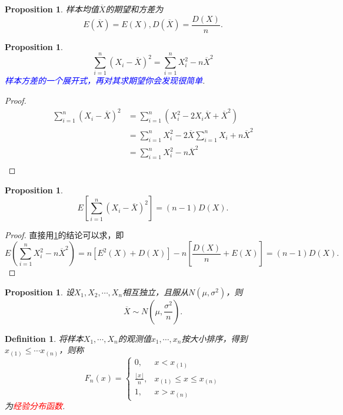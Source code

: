 \documentclass{article}
\newtheorem{proposition}[theorem]{Proposition}
\newtheorem{definition}[theorem]{Definition}
\newcommand{\redt}[1]{\textcolor{red}{#1}}
\newcommand{\bluet}[1]{\textcolor{blue}{#1}}
\begin{document}
\begin{proposition}
\rm 样本均值$\overline{X}$的期望和方差为 
$$
E(\overline{X}) = E(X), D(\overline{X})=\frac{D(X)}{n}.
$$
\end{proposition}

\begin{proposition}\label{sample-variance-expand}
\rm 
$$
\sum\limits_{i = 1}^n (X_i - \overline{X})^2 = \sum\limits_{i = 1}^n X_i^2 -  n\overline{X}^2 
$$
\bluet{样本方差的一个展开式，再对其求期望你会发现很简单}. 
\end{proposition}

\begin{proof}
$$
\begin{array}{ll}
\sum\limits_{i = 1}^n (X_i - \overline{X})^2 &= \sum\limits_{i = 1}^n (X_i^2 - 2X_i\overline{X} + \overline{X}^2)  \\
&=  \sum\limits_{i = 1}^n X_i^2 - 2\overline{X} \sum\limits_{i = 1}^n X_i + n\overline{X}^2 \\
&= \sum\limits_{i = 1}^n X_i^2  - n\overline{X}^2\\
\end{array}
$$
\end{proof}

\begin{proposition}
\rm 
$$
E\left[ \sum\limits_{i = 1}^n  (X_i - \overline{X})^2 \right] = (n-1)D(X).
$$
\end{proposition}

\begin{proof}
\rm 直接用\ref{sample-variance-expand}的结论可以求，即
$$
E(\sum\limits_{i = 1}^n X_i^2  - n\overline{X}^2) = n\left[E^2(X) + D(X)\right]- n\left[\frac{D(X)}{n} + E(X)\right] = (n-1)D(X). 
$$
\end{proof}

\begin{proposition}\label{sample-mean-distribution}
\rm 设$X_1,X_2,\cdots,X_n$相互独立，且服从$N(\mu,\sigma^2)$，则
$$
\overline{X} \sim N(\mu,\frac{\sigma^2}{n}).
$$
\end{proposition}

\begin{definition}
\rm 将样本$X_1,\cdots,X_n$的观测值$x_1,\cdots,x_n$按大小排序，得到$x_{(1)} \leq \cdots x_{(n)}$，则称
$$
F_n(x) = \left\{
\begin{array}{ll}
0, & x <x_{(1)} \\
\frac{\lfloor x \rfloor}{n}, &  x_{(1)}\leq x \leq x_{(n)}\\
1, &x > x_{(n)}
\end{array} \right.
$$
为\redt{经验分布函数}.
\end{definition}
\end{document}
